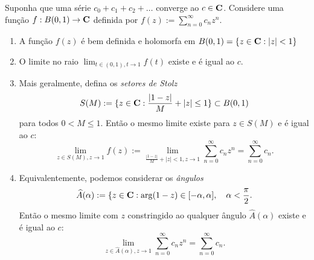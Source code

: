 \begin{teorema}
\label{t:abel-limite}
Suponha que uma série $c_0 + c_1 + c_2 + \dots$ converge ao $c\in\mathbf{C}$.
Considere uma função $f: B(0,1) \to \mathbf{C}$ definida
por $f(z) := \sum_{n=0}^\infty c_n z^n$.
\begin{enumerate}
\item A função $f(z)$ é bem definida e holomorfa em $B(0,1) = \{z\in\mathbf{C}: |z|<1\}$
\item O limite no raio $\lim_{t\in(0,1),t\to 1} f(t)$ existe e é igual ao $c$.
\item Mais geralmente, defina os \emph{setores de Stolz}
\[ S(M) := \{z\in \mathbf{C}: \frac{|1-z|}M + |z| \leq 1 \} \subset B(0,1) \]
para todos $0 < M \leq 1$.
Então o mesmo limite existe para $z\in S(M)$ e é igual ao $c$:
\[ \lim_{z\in S(M),z\to 1} f(z) 
:= \lim_{\frac{|1-z|}M + |z|<1,z\to 1} \sum_{n=0}^\infty c_n z^n = \sum_{n=0}^\infty c_n. \]
\item Equivalentemente, podemos considerar os \emph{ângulos}
\[ \widehat{A}(\alpha) := \{z\in \mathbf{C}: \arg(1-z) \in [-\alpha,\alpha], \quad \alpha < \frac{\pi}2. \]
Então o mesmo limite com $z$ constringido ao qualquer ângulo $\widehat{A}(\alpha)$ existe e é igual ao $c$:
\[ \lim_{z\in \widehat{A}(\alpha),z\to 1} \sum_{n=0}^\infty c_n z^n = \sum_{n=0}^\infty c_n. \]
\end{enumerate}
\end{teorema}

